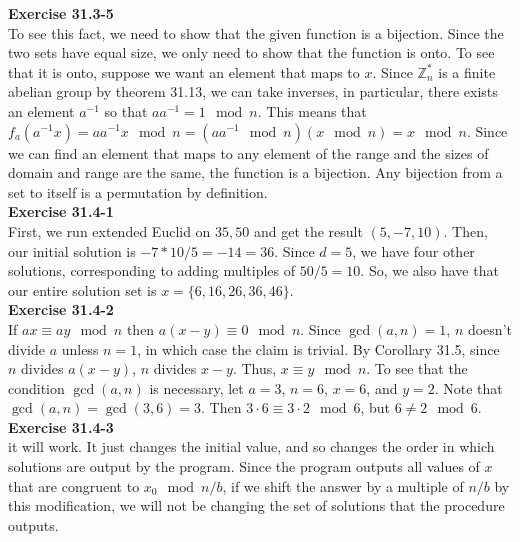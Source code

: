 \documentclass{article}
\newcommand{\Z}{\mathbb{Z}}
\begin{document}
\noindent\textbf{Exercise 31.3-5}\\

To see this fact, we need to show that the given function is a bijection. Since the two sets have equal size, we only need to show that the function is onto. To see that it is onto, suppose we want an element that maps to $x$. Since $\Z_n^*$ is a finite abelian group by theorem 31.13, we can take inverses, in particular, there exists an element $a^{-1}$ so that $a a^{-1} = 1 \mod n$. This means that $f_a(a^{-1} x) =a a^{-1} x \mod n = (a a^{-1} \mod n) (x \mod n) = x \mod n$. Since we can find an element that maps to any element of the range and the sizes of domain and range are the same, the function is a bijection. Any bijection from a set to itself is a permutation by definition.\\



\noindent\textbf{Exercise 31.4-1}\\

First, we run extended Euclid on $35,50$ and get the result $(5,-7,10)$. Then, our initial solution is $-7*10/5 = -14 = 36$. Since $d=5$, we have four other solutions, corresponding to adding multiples of $50/5 =10$. So, we also have that our entire solution set is $x =\{6,16,26,36,46\}$.\\

\noindent\textbf{Exercise 31.4-2}\\

If $ax \equiv ay \mod n$ then $a(x-y) \equiv 0 \mod n$.  Since $\gcd(a,n) = 1$, $n$ doesn't divide $a$ unless $n = 1$, in which case the claim is trivial.  By Corollary 31.5, since $n$ divides $a(x-y)$, $n$ divides $x-y$.  Thus, $x \equiv y \mod n$.  To see that the condition $\gcd(a,n)$ is necessary, let $a=3$, $n=6$, $x=6$, and $y=2$.  Note that $\gcd(a,n) = \gcd(3,6) = 3$.  Then $3\cdot 6 \equiv 3\cdot 2 \mod 6$, but $6 \neq 2 \mod 6$. \\

\noindent\textbf{Exercise 31.4-3}\\

it will work. It just changes the initial value, and so changes the order in which solutions are output by the program. Since the program outputs all values of $x$ that are congruent to $x_0 \mod n/b$, if we shift the answer by a multiple of $n/b$ by this modification, we will not be changing the set of solutions that the procedure outputs.\\
\end{document}
